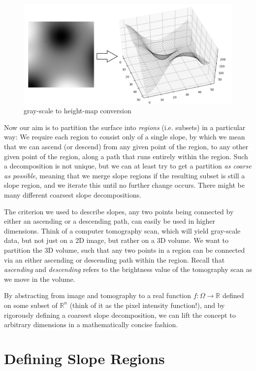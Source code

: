 \documentclass[a4paper,12pt,notitlepage,fullpage]{paper}
\theoremstyle{plain}
\theoremstyle{definition}
\begin{document}
\begin{figure}[h]
\includegraphics[width=\textwidth]{img/visu1.png}
\caption{gray-scale to height-map conversion}
\label{fig:conversion}
\end{figure}

Now our aim is to partition the surface into \emph{regions} (i.e. subsets) in a particular way:
We require each region to consist only of a single slope, by which we mean that we can ascend (or descend) from any given point of the region, to any other given point of the region, along a path that runs entirely within the region.
Such a decomposition is not unique, but we can at least try to get a partition \emph{as coarse as possible}, meaning that we merge slope regions if the resulting subset is still a slope region, and we iterate this until no further change occurs.
There might be many different coarsest slope decompositions.

The criterion we used to describe slopes, any two points being connected by either an ascending or a descending path, can easily be used in higher dimensions.
Think of a computer tomography scan, which will yield gray-scale data, but not just on a 2D image, but rather on a 3D volume.
We want to partition the 3D volume, such that any two points in a region can be connected via an either ascending or descending path within the region.
Recall that \emph{ascending} and \emph{descending} refers to the brightness value of the tomography scan as we move in the volume.

By abstracting from image and tomography to a real function $f: \Omega \rightarrow \mathbb{R}$ defined on some subset of $\mathbb{R}^n$ (think of it as the pixel intensity function!), and by rigorously defining a coarsest slope decomposition, we can lift the concept to arbitrary dimensions in a mathematically concise fashion.

\section{Defining Slope Regions}
\label{sec:definitions}
\end{document}
